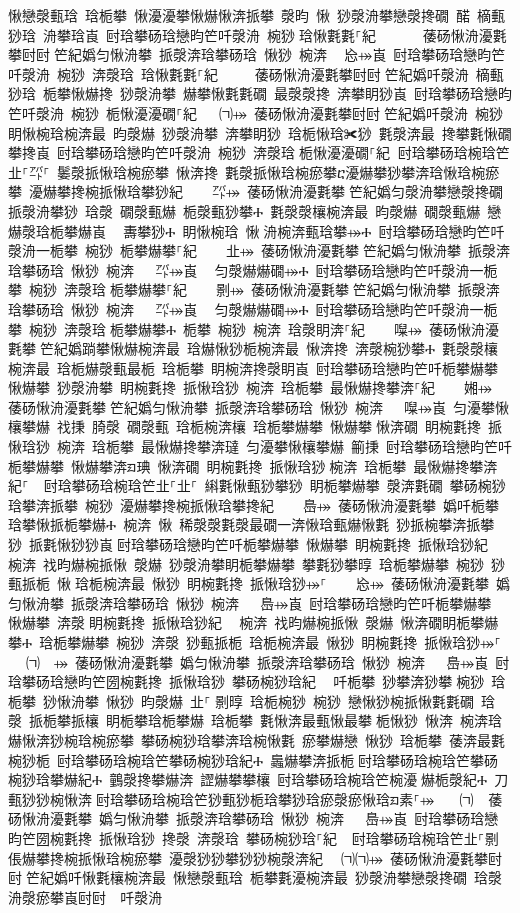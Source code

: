 ﻿\documentclass[output=paper]{langsci/langscibook}
\begin{document}
\begin{exe}
{\begin{exe}
愀戀漀甀琀 琀栀攀 愀瀀瀀攀愀爀愀渀挀攀 漀昀 愀 猀漀洀攀戀漀搀礀 䤀 樀甀猀琀 洀攀琀崀 尀琀攀砀琀戀昀笀吀漀洀 椀猀਀琀愀氀氀⸀紀਀਀⠀㄀　⤀ 䔀砀愀洀瀀氀攀尀尀਀笀紀嬀匀愀洀攀 挀漀渀琀攀砀琀 愀猀 椀渀 ⠀㤀⤀崀 尀琀攀砀琀戀昀笀吀漀洀 椀猀 渀漀琀 琀愀氀氀⸀紀਀਀⠀㄀㄀⤀ 䔀砀愀洀瀀氀攀尀尀਀笀紀嬀吀漀洀 樀甀猀琀 栀攀愀爀搀 猀漀洀攀 爀攀愀氀氀礀 最漀漀搀 渀攀眀猀崀 尀琀攀砀琀戀昀笀吀漀洀 椀猀 栀愀瀀瀀礀⸀紀਀਀⠀㄀㈀⤀ 䔀砀愀洀瀀氀攀尀尀਀笀紀嬀吀漀洀 椀猀 眀愀椀琀椀渀最 昀漀爀 猀漀洀攀 渀攀眀猀 琀栀愀琀✀猀 氀漀渀最 搀攀氀愀礀攀搀崀 尀琀攀砀琀戀昀笀吀漀洀 椀猀 渀漀琀਀栀愀瀀瀀礀⸀紀਀਀尀琀攀砀琀椀琀笀㐀⸀㌀⸀ 䰀漀挀愀琀椀瘀攀 愀渀搀 氀漀挀愀琀椀瘀攀ⴀ瀀爀攀猀攀渀琀愀琀椀瘀攀 瀀爀攀搀椀挀愀琀攀猀紀 ਀਀⠀㄀㌀⤀ 䔀砀愀洀瀀氀攀਀笀紀嬀匀漀洀攀戀漀搀礀 挀漀洀攀猀 琀漀 礀漀甀爀 栀漀甀猀攀Ⰰ 氀漀漀欀椀渀最 昀漀爀 礀漀甀爀 戀爀漀琀栀攀爀崀 ⠀夀攀猀Ⰰ 眀愀椀琀 愀਀洀椀渀甀琀攀⤀Ⰰ 尀琀攀砀琀戀昀笀吀漀洀⼀栀攀 椀猀 栀攀爀攀⸀紀 ਀਀⠀㄀㐀⤀ 䔀砀愀洀瀀氀攀਀笀紀嬀匀愀洀攀 挀漀渀琀攀砀琀 愀猀 椀渀 ⠀㄀㌀⤀崀 ⠀匀漀爀爀礀⤀Ⰰ 尀琀攀砀琀戀昀笀吀漀洀⼀栀攀 椀猀 渀漀琀਀栀攀爀攀⸀紀 ਀਀⠀㄀㔀⤀ 䔀砀愀洀瀀氀攀਀笀紀嬀匀愀洀攀 挀漀渀琀攀砀琀 愀猀 椀渀 ⠀㄀㌀⤀崀 ⠀匀漀爀爀礀⤀Ⰰ 尀琀攀砀琀戀昀笀吀漀洀⼀栀攀 椀猀 渀漀琀਀栀攀爀攀Ⰰ 栀攀 椀猀 椀渀 琀漀眀渀⸀紀 ਀਀⠀㄀㘀⤀ 䔀砀愀洀瀀氀攀਀笀紀嬀䠀攀愀爀椀渀最 琀爀愀猀栀椀渀最 愀渀搀 渀漀椀猀攀Ⰰ 氀漀漀欀椀渀最 琀栀爀漀甀最栀 琀栀攀 眀椀渀搀漀眀崀 尀琀攀砀琀戀昀笀吀栀攀爀攀਀愀爀攀 猀漀洀攀 眀椀氀搀 挀愀琀猀 椀渀 琀栀攀 最愀爀搀攀渀⸀紀 ਀਀⠀㄀㜀⤀ 䔀砀愀洀瀀氀攀਀笀紀嬀匀愀洀攀 挀漀渀琀攀砀琀 愀猀 椀渀 ⠀㄀㘀⤀崀 匀瀀攀愀欀攀爀 䄀㨀 䐀漀 礀漀甀 琀栀椀渀欀 琀栀攀爀攀 愀爀攀਀愀渀礀 眀椀氀搀 挀愀琀猀 椀渀 琀栀攀 最愀爀搀攀渀㼀 匀瀀攀愀欀攀爀 䈀㨀 尀琀攀砀琀戀昀笀吀栀攀爀攀 愀爀攀渀ᤀ琠 愀渀礀 眀椀氀搀 挀愀琀猀਀椀渀 琀栀攀 最愀爀搀攀渀紀⸀ ਀਀尀琀攀砀琀椀琀笀㐀⸀㐀⸀ 䌀氀愀甀猀攀猀 眀栀攀爀攀 漀渀氀礀 攀砀椀猀琀攀渀挀攀 椀猀 瀀爀攀搀椀挀愀琀攀搀紀 ਀਀⠀㄀㠀⤀ 䔀砀愀洀瀀氀攀 嬀吀栀攀 琀攀愀挀栀攀爀Ⰰ 椀渀 愀 稀漀漀氀漀最礀⼀渀愀琀甀爀愀氀 猀挀椀攀渀挀攀猀 挀氀愀猀猀崀਀尀琀攀砀琀戀昀笀吀栀攀爀攀 愀爀攀 眀椀氀搀 挀愀琀猀紀 ⠀椀渀 䄀昀爀椀挀愀 漀爀 猀漀洀攀眀栀攀爀攀 攀氀猀攀㬀 琀栀攀爀攀 椀猀 猀甀挀栀 愀਀琀栀椀渀最 愀猀 眀椀氀搀 挀愀琀猀⤀⸀ ਀਀⠀㄀㤀⤀ 䔀砀愀洀瀀氀攀 嬀匀愀洀攀 挀漀渀琀攀砀琀 愀猀 椀渀 ⠀㄀㠀⤀崀 尀琀攀砀琀戀昀笀吀栀攀爀攀 愀爀攀 渀漀਀眀椀氀搀 挀愀琀猀紀 ⠀椀渀 䄀昀爀椀挀愀 漀爀 愀渀礀眀栀攀爀攀Ⰰ 琀栀攀爀攀 椀猀 渀漀 猀甀挀栀 琀栀椀渀最 愀猀 眀椀氀搀 挀愀琀猀⤀⸀ ਀਀⠀㈀　⤀ 䔀砀愀洀瀀氀攀 嬀匀愀洀攀 挀漀渀琀攀砀琀 愀猀 椀渀 ⠀㄀㠀⤀崀 尀琀攀砀琀戀昀笀圀椀氀搀 挀愀琀猀 攀砀椀猀琀紀 ⠀吀栀攀 猀攀渀猀攀਀椀猀 琀栀攀 猀愀洀攀 愀猀 昀漀爀 㐀⸀㄀㔀㬀 琀栀椀猀 椀猀 戀愀猀椀挀愀氀氀礀 琀漀 挀栀攀挀欀 眀栀攀琀栀攀爀 琀栀攀 氀愀渀最甀愀最攀਀栀愀猀 愀渀 椀渀琀爀愀渀猀椀琀椀瘀攀 攀砀椀猀琀攀渀琀椀愀氀 瘀攀爀戀 愀猀 琀栀攀 䔀渀最氀椀猀栀 尀琀攀砀琀椀琀笀攀砀椀猀琀紀Ⰰ 䘀爀攀渀挀栀਀尀琀攀砀琀椀琀笀攀砀椀猀琀攀爀紀Ⰰ 䴀漀搀攀爀渀 䜀爀攀攀欀 尀琀攀砀琀椀琀笀椀瀀爀栀漀紀Ⰰ 刀甀猀猀椀愀渀਀尀琀攀砀琀椀琀笀猀甀猀栀琀攀猀琀瘀漀瘀愀琀ᤀ素⸀⤀ ਀਀⠀㈀㄀⤀ 䔀砀愀洀瀀氀攀 嬀匀愀洀攀 挀漀渀琀攀砀琀 愀猀 椀渀 ⠀㄀㠀⤀崀 尀琀攀砀琀戀昀笀圀椀氀搀 挀愀琀猀 搀漀 渀漀琀 攀砀椀猀琀⸀紀 ਀਀尀琀攀砀琀椀琀笀㐀⸀㔀 倀爀攀搀椀挀愀琀椀瘀攀 瀀漀猀猀攀猀猀椀漀渀紀਀਀⠀㈀㈀⤀ 䔀砀愀洀瀀氀攀尀尀਀笀紀嬀吀愀氀欀椀渀最 愀戀漀甀琀 栀攀氀瀀椀渀最 猀漀洀攀戀漀搀礀 琀漀 洀漀瘀攀崀尀尀਀⠀吀漀洀 
\end{exe}}
\end{exe}
\end{document}
